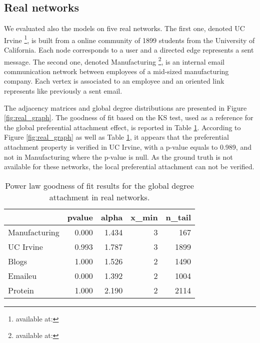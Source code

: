 \documentclass[a4paper, 12pt]{article}
\begin{document}
\subsection{Real networks}

We evaluated also the models on five real networks.
The first one, denoted UC Irvine \footnote{available at:}, is built from a online community of 1899 students from the University of California. Each node corresponds to a user and a   directed edge represents a sent message.
The second one, denoted Manufacturing \footnote{available at:}, is an internal email communication network between employees of a mid-sized manufacturing company. Each vertex is associated  to an employee and an oriented link represents like previously a sent email.

The adjacency matrices and global degree distributions are presented in Figure \ref{fig:real_graph}. The goodness of fit based on the KS test, used as a reference for the global preferential attachment effect, is reported in Table \ref{table:real_graph}. According to Figure \ref{fig:real_graph} as well as Table \ref{table:real_graph}, it appears that the preferential attachment property is verified in UC Irvine, with a p-value equals to 0.989, and not in Manufacturing where the p-value is null. As the ground truth is not available for these networks, the local preferential attachment can not be verified.



\begin{table}
\caption{Power law goodness of fit results for the global degree attachment in real networks.}
\centering
\begin{tabular}{lrrrr}
	\hline
	&   pvalue &   alpha &   x\_min &   n\_tail \\
	\hline
	Manufacturing &    0.000 &   1.434 &       3 &      167 \\
	UC Irvine     &    0.993 &   1.787 &       3 &     1899 \\
	Blogs         &    1.000 &   1.526 &       2 &     1490 \\
	Emaileu       &    0.000 &   1.392 &       2 &     1004 \\
	Protein       &    1.000 &   2.190 &       2 &     2114 \\
	\hline
\end{tabular}

\label{table:real_graph}
\end{table}
\end{document}
